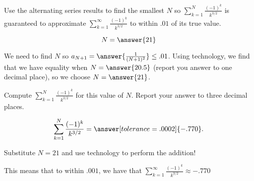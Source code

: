 \documentclass{ximera}
\author{Jim Talamo}
\begin{document}
\begin{exercise}
Use the alternating series results to find the smallest $N$ so $\sum_{k=1}^N \frac{(-1)^k}{k^{3/2}}$ is guaranteed to approximate $\sum_{k=1}^\infty \frac{(-1)^k}{k^{3/2}}$ to within $.01$ of its true value.  

\[
N = \answer{ 21 } 
\]

\begin{hint}
We need to find $N$ so $a_{N+1} = \answer{\frac{1}{(N+1)^2}} \leq .01$.  Using technology, we find that we have equality when $N=\answer{20.5}$ (report you answer to one decimal place), so we choose $N = \answer{21}$.
\end{hint}

\begin{exercise}
Compute  $\sum_{k=1}^N \frac{(-1)^k}{k^{3/2}}$ for this value of $N$.  Report your answer to three decimal places.

\[
\sum_{k=1}^N \frac{(-1)^k}{k^{3/2}} = \answer[tolerance=.0002]{-.770}. 
\]

\begin{hint}
Substitute $N=21$ and use technology to perform the addition!
\end{hint}
\begin{feedback}
This means that to within $.001$, we have that $\sum_{k=1}^\infty \frac{(-1)^k}{k^{3/2}} \approx -.770 $
\end{feedback}
\end{exercise}
\end{exercise}
\end{document}
